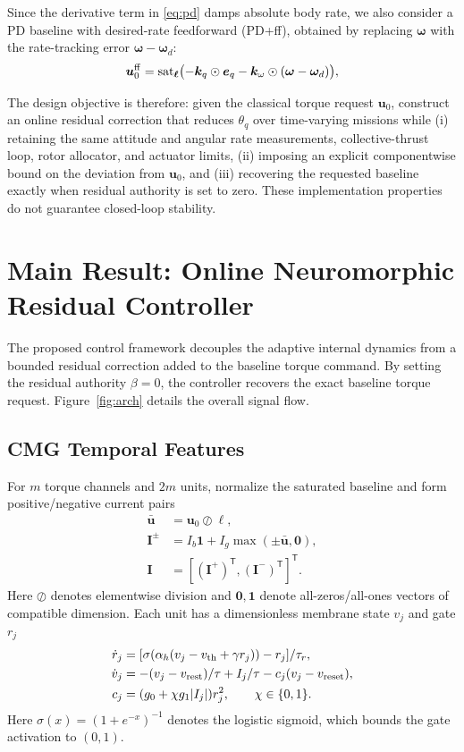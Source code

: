 \documentclass[letterpaper, 10 pt, conference]{ieeeconf}
\newcommand{\T}{^{\mathsf T}}
\newcommand{\sat}{\operatorname{sat}}
\begin{document}
Since the derivative term in \eqref{eq:pd} damps absolute body rate,
we also consider a PD baseline with desired-rate feedforward (PD+ff),
obtained by replacing $\bm\omega$ with the rate-tracking error
$\bm\omega-\bm\omega_d$:
\begin{equation}
 \bm u_0^{\rm ff}=\sat_{\bm\ell}\bigl(-\bm k_q\odot\bm e_q-\bm k_\omega\odot(\bm\omega-\bm\omega_d)\bigr),
 \label{eq:pdff}
\end{equation}

The design objective is therefore: given the classical torque request $\bm u_0$, construct an online residual correction that reduces $\theta_q$ over time-varying missions while (i) retaining the same attitude and angular rate measurements, collective-thrust loop, rotor allocator, and actuator limits, (ii) imposing an explicit componentwise bound on the deviation from $\bm u_0$, and (iii) recovering the requested baseline exactly when residual authority is set to zero. These implementation properties do not guarantee closed-loop stability.


\section{Main Result: Online Neuromorphic Residual Controller}
\label{sec:main}
The proposed control framework decouples the adaptive internal dynamics from a bounded residual correction added to the baseline torque command. By setting the residual authority $\beta = 0$, the controller recovers the exact baseline torque request. Figure~\ref{fig:arch} details the overall signal flow.


\subsection{CMG Temporal Features}

For $m$ torque channels and $2m$ units, normalize the saturated baseline and form positive/negative current pairs
\begin{equation}
 \begin{aligned}
 \bar{\bm u}&=\bm u_0\oslash\bm\ell,\\
 \bm I^{\pm}&=I_b\bm1+I_g\max(\pm\bar{\bm u},\bm0),\\
 \bm I&=[(\bm I^+)\T,(\bm I^-)\T]\T.
 \end{aligned}
 \label{eq:encoding}
\end{equation}
Here $\oslash$ denotes elementwise division and $\bm 0,\bm 1$ denote all-zeros/all-ones vectors of compatible dimension. Each unit has a dimensionless membrane state $v_j$ and gate $r_j$
\begin{align}
 \dot r_j&=[\sigma(\alpha_h(v_j-v_{\rm th}+\gamma r_j))-r_j]/\tau_r,\\
 \dot v_j&=-(v_j-v_{\rm rest})/\tau+I_j/\tau-c_j(v_j-v_{\rm reset}),\\
 c_j&=(g_0+\chi g_1|I_j|)r_j^2,\qquad \chi\in\{0,1\}.
 \label{eq:cmg}
\end{align}
Here $\sigma(x)=(1+e^{-x})^{-1}$ denotes the logistic sigmoid, which bounds the gate activation to $(0,1)$.
\end{document}
